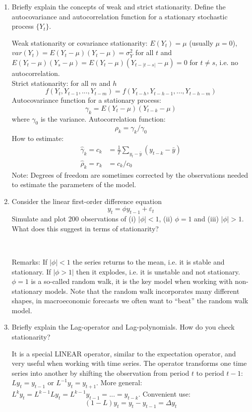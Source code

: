 \documentclass[a4paper]{scrartcl}
\begin{document}
\begin{enumerate}
        \item Briefly explain the concepts of weak and strict stationarity. Define the autocovariance and autocorrelation function for a stationary stochastic process $\{Y_t\}$.
              \begin{solution}
                  Weak stationarity or covariance stationarity: $E(Y_t)=\mu$ (usually $\mu=0$), $var(Y_t)=E(Y_t - \mu)(Y_t-\mu)=\sigma_Y^2$ for all $t$ and $E(Y_t-\mu)(Y_s-\mu)=E(Y_t-\mu)(Y_{t-|t-s|}-\mu)=0$ for $t\neq s$, i.e. no autocorrelation.\\
                  Strict stationarity: for all $m$ and $h$ $$f(Y_t,Y_{t-1},...,Y_{t-m})=f(Y_{t-h},Y_{t-h-1},...,Y_{t-h-m})$$
                  Autocovariance function for a stationary process: $$\gamma_k = E(Y_t - \mu)(Y_{t-k}-\mu)$$ where $\gamma_0$ is the variance. Autocorrelation function: $$\rho_k = \gamma_k/\gamma_0$$ How to estimate:
                  \begin{align*}
                      \hat{\gamma}_k = c_k & = \frac{1}{T} \sum_{y_t -\bar{y}}(y_{t-k}-\bar{y}) \\
                      \hat{\rho}_k = r_k   & = c_k/c_0
                  \end{align*}
                  Note: Degrees of freedom are sometimes corrected by the observations needed to estimate the parameters of the model.
              \end{solution}
              
        \item Consider the linear first-order difference equation $$y_t=\phi y_{t-1}+\varepsilon_t$$ Simulate and plot 200 observations of (i) $|\phi|<1$, (ii) $\phi=1$ and (iii) $|\phi| >1$. What does this suggest in terms of stationarity?
              \begin{solution}~
                  
                  Remarks: If $|\phi|<1$ the series returns to the mean, i.e. it is stable and stationary. If $|\phi>1|$ then it explodes, i.e. it is unstable and not stationary. $\phi=1$ is a so-called random walk, it is the key model when working with non-stationary models. Note that the random walk incorporates many different shapes, in macroeconomic forecasts we often want to \enquote{beat} the random walk model.
              \end{solution}
        \item Briefly explain the Lag-operator and Lag-polynomials. How do you check stationarity?
              \begin{solution}
                  It is a special LINEAR operator, similar to the expectation operator, and very useful when working with time series. The operator transforms one time series into another by shifting the observation from period $t$ to period $t-1$: $Ly_t = y_{t-1}$ or $L^{-1} y_t =y_{t+1}$. More general: $L^k y_t = L^{k-1} L y_t = L^{k-1} y_{t-1} = ... = y_{t-k}$. Convenient use:
                  $$(1-L)y_t = y_t - y_{t-1}= \Delta y_t$$
                  

\end{solution}
\end{enumerate}
\end{document}
